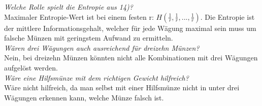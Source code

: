 \documentclass[11pt,a4paper]{article}
\begin{document}
  \textit{Welche Rolle spielt die Entropie aus 14)?}\\
  \newline
  Maximaler Entropie-Wert ist bei einem festen r: $H(\frac{1}{r}, \frac{1}{r}, ..., \frac{1}{r})$. Die Entropie ist der mittlere Informationsgehalt, welcher für jede Wägung maximal sein muss um falsche Münzen mit geringstem Aufwand zu ermitteln.\\
  
  \textit{Wären drei Wägungen auch ausreichend für dreizehn Münzen?}\\
  \newline
  Nein, bei dreizehn Münzen könnten nicht alle Kombinationen mit drei Wägungen aufgelöst werden.\\
  
  \textit{Wäre eine Hilfsmünze mit dem richtigen Gewicht hilfreich?}\\
  \newline
  Wäre nicht hilfreich, da man selbst mit einer Hilfsmünze nicht in unter drei Wägungen erkennen kann, welche Münze falsch ist.\\
  
\end{document}
